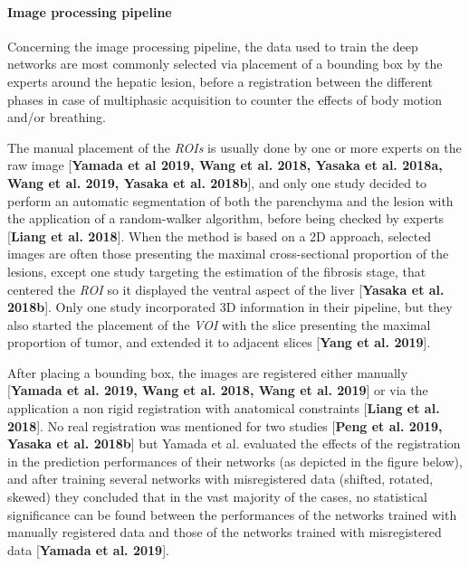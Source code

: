 \documentclass[]{article}
\let\oldparagraph\paragraph
\renewcommand{\paragraph}[1]{\oldparagraph{#1}\mbox{}}
\begin{document}
\paragraph{Image processing pipeline}\label{image-processing-pipeline}

Concerning the image processing pipeline, the data used to train the
deep networks are most commonly selected via placement of a bounding box
by the experts around the hepatic lesion, before a registration between
the different phases in case of multiphasic acquisition to counter the
effects of body motion and/or breathing.

The manual placement of the \emph{ROIs} is usually done by one or more
experts on the raw image {[}\textbf{Yamada et al 2019, Wang et al. 2018,
Yasaka et al. 2018a, Wang et al. 2019, Yasaka et al. 2018b}{]}, and only
one study decided to perform an automatic segmentation of both the
parenchyma and the lesion with the application of a random-walker
algorithm, before being checked by experts {[}\textbf{Liang et al.
2018}{]}. When the method is based on a 2D approach, selected images are
often those presenting the maximal cross-sectional proportion of the
lesions, except one study targeting the estimation of the fibrosis
stage, that centered the \emph{ROI} so it displayed the ventral aspect
of the liver {[}\textbf{Yasaka et al. 2018b}{]}. Only one study
incorporated 3D information in their pipeline, but they also started the
placement of the \emph{VOI} with the slice presenting the maximal
proportion of tumor, and extended it to adjacent slices {[}\textbf{Yang
et al. 2019}{]}.

After placing a bounding box, the images are registered either manually
{[}\textbf{Yamada et al. 2019, Wang et al. 2018, Wang et al. 2019}{]} or
via the application a non rigid registration with anatomical constraints
{[}\textbf{Liang et al. 2018}{]}. No real registration was mentioned for
two studies {[}\textbf{Peng et al. 2019, Yasaka et al. 2018b}{]} but
Yamada et al. evaluated the effects of the registration in the
prediction performances of their networks (as depicted in the figure
below), and after training several networks with misregistered data
(shifted, rotated, skewed) they concluded that in the vast majority of
the cases, no statistical significance can be found between the
performances of the networks trained with manually registered data and
those of the networks trained with misregistered data {[}\textbf{Yamada
et al. 2019}{]}.
\end{document}
